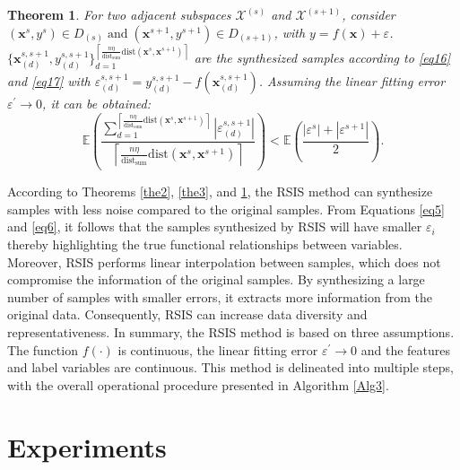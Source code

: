 \documentclass[lettersize,journal]{IEEEtran}
\newtheorem{theorem}{Theorem}
\begin{document}
\begin{theorem}
\label{the4}
For two adjacent subspaces $\mathcal{X}^{(s)}$ and 
$\mathcal{X}^{(s+1)}$, consider $(\boldsymbol{x}^s,{y}^s)\in D_{(s)}
\;\text{and}\; (\boldsymbol{x}^{s+1},{y}^{s+1})\in D_{(s+1)}$, 
with ${y}=f(\boldsymbol{x})+\varepsilon$. $\{\boldsymbol{x}_{(d)}
^{s,s+1},y_{(d)}^{s,s+1} \}_{d=1}^{\left\lceil \frac{n\eta }
{\text{dist}_{\text{sum}}}\text{dist}(\boldsymbol{x}^s,\boldsymbol
{x}^{s+1})\right\rceil}$ are the synthesized samples according to 
\eqref{eq16} and \eqref{eq17} with $\varepsilon^{s,s+1}_{(d)}=
y_{(d)}^{s,s+1}-f(\boldsymbol{x}_{(d)}^{s,s+1})$. Assuming the 
linear fitting error $\varepsilon^\prime\rightarrow0$, it can be 
obtained:
\begin{equation*}
\mathbb{E}(\frac{\textstyle\sum_{d=1}^{{\left\lceil \frac{n\eta }{\text{dist}_{\text{sum}}}\text{dist}(\boldsymbol{x}^s,\boldsymbol{x}^{s+1})\right\rceil}}{|\varepsilon^{s,s+1}_{(d)}|}}{\left\lceil \frac{n\eta }{\text{dist}_{\text{sum}}}\text{dist}(\boldsymbol{x}^s,\boldsymbol{x}^{s+1})\right\rceil})<\mathbb{E}(\frac{|\varepsilon^s|+|\varepsilon^{s+1}|}{2}).
\end{equation*}
\end{theorem}

According to Theorems \ref{the2}, \ref{the3}, and \ref{the4}, 
the RSIS method can synthesize samples with less noise compared 
to the original samples. From Equations \eqref{eq5} 
and \eqref{eq6}, it follows that the samples synthesized by RSIS 
will have smaller $\varepsilon_i$ thereby highlighting the true 
functional relationships between variables. Moreover, RSIS performs 
linear interpolation between samples, which does not compromise the 
information of the original samples. By synthesizing a large number 
of samples with smaller errors, it extracts more information from the original 
data. Consequently, RSIS can increase data diversity and representativeness.
In summary, the RSIS method is based on three assumptions. 
The function $f(\cdot)$ is continuous, the linear fitting 
error $\varepsilon^\prime\rightarrow0$ and the features 
and label variables are continuous. This method is 
delineated into multiple steps, with the overall 
operational procedure presented in Algorithm \ref{Alg3}.


\section{Experiments}
\end{document}
